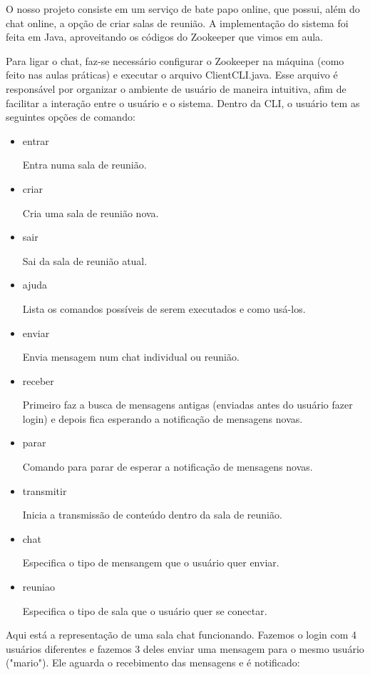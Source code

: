 \setlength{\parindent}{4em}
\setlength{\parskip}{1em}

O nosso projeto consiste em um serviço de bate papo online, que possui, além do chat online, a opção de criar salas de reunião. A implementação do sistema foi feita em Java, aproveitando os códigos do Zookeeper que vimos em aula.\par
Para ligar o chat, faz-se necessário configurar o Zookeeper na máquina (como feito nas aulas práticas) e executar o arquivo ClientCLI.java. Esse arquivo é responsável por organizar o ambiente de usuário de maneira intuitiva, afim de facilitar a interação entre o usuário e o sistema. Dentro da CLI, o usuário tem as seguintes opções de comando:
\begin{itemize}
	\item entrar
	\par Entra numa sala de reunião.
	\item criar
	\par Cria uma sala de reunião nova.
	\item sair
	\par Sai da sala de reunião atual.
	\item ajuda
	\par Lista os comandos possíveis de serem executados e como usá-los.
	\item enviar
	\par Envia mensagem num chat individual ou reunião.
	\item receber
	\par Primeiro faz a busca de mensagens antigas (enviadas antes do usuário fazer login) e depois fica esperando a notificação de mensagens novas.
	\item parar
	\par Comando para parar de esperar a notificação de mensagens novas.
	\item transmitir
	\par Inicia a transmissão de conteúdo dentro da sala de reunião.
	\item chat
	\par Especifica o tipo de mensangem que o usuário quer enviar.
	\item reuniao
	\par Especifica o tipo de sala que o usuário quer se conectar.
\end{itemize}
\par
Aqui está a representação de uma sala chat funcionando. Fazemos o login com 4 usuários diferentes e fazemos 3 deles enviar uma mensagem para o mesmo usuário ("mario"). Ele aguarda o recebimento das mensagens e é notificado:
